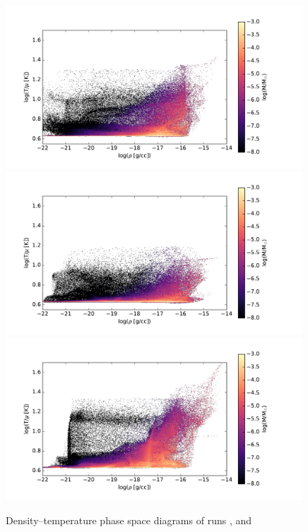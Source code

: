 \begin{figure}[!htb]
 \centering
 \includegraphics[width=0.99\textwidth]{Figures/var_rt_larson_plots/rho_temp_hist_n100c1}
 \includegraphics[width=0.99\textwidth]{Figures/var_rt_larson_plots/rho_temp_hist_n10c1}
 \includegraphics[width=0.99\textwidth]{Figures/var_rt_larson_plots/rho_temp_hist_n1c1}
 \captionsetup{justification=justified,singlelinecheck=false,width=\linewidth}
 \decoRule
 \caption[ $\rho$--T phase diagrams]{Density--temperature phase space diagrams of runs ,  and }
\label{fig:c1.0_r_t_larson}
\end{figure}
\FloatBarrier


